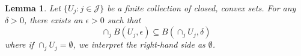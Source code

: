 \documentclass{article}
\newtheorem{lemma}{Lemma}
\begin{document}
%
\begin{lemma} \label{lemma:thick-int}
  Let $\{U_j : j \in \mathcal{J}\}$ be a finite collection of closed, convex sets.
  For any $\delta > 0$, there exists an $\epsilon > 0$ such that
  \[ \cap_j B(U_j,\epsilon) \subseteq B\left(\cap_j U_j, \delta\right)  \]
  where if $\cap_j U_j = \emptyset$, we interpret the right-hand side as $\emptyset$.
\end{lemma}
\end{document}
